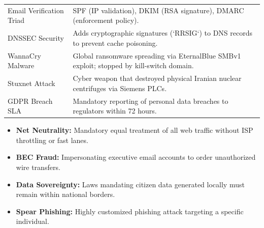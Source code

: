 \documentclass[12pt,a4paper]{article}
\renewcommand{\arraystretch}{1.45}
\begin{document}
\begin{tcolorbox}[formulabox, title={\textbf{Key Concepts and Metrics at a Glance}}]
\renewcommand{\arraystretch}{1.35}
\begin{tabularx}{\linewidth}{B{4.8cm} X}
Email Verification Triad & SPF (IP validation), DKIM (RSA signature), DMARC (enforcement policy). \\[3pt]
DNSSEC Security & Adds cryptographic signatures (`RRSIG`) to DNS records to prevent cache poisoning. \\[3pt]
WannaCry Malware & Global ransomware spreading via EternalBlue SMBv1 exploit; stopped by kill-switch domain. \\[3pt]
Stuxnet Attack & Cyber weapon that destroyed physical Iranian nuclear centrifuges via Siemens PLCs. \\[3pt]
GDPR Breach SLA & Mandatory reporting of personal data breaches to regulators within 72 hours.
\end{tabularx}
\end{tcolorbox}

\begin{tcolorbox}[defbox, title={\textbf{One-Line Definitions}}]
\begin{itemize}[leftmargin=*, itemsep=2pt, topsep=0pt]
  \item \textbf{Net Neutrality:} Mandatory equal treatment of all web traffic without ISP throttling or fast lanes.
  \item \textbf{BEC Fraud:} Impersonating executive email accounts to order unauthorized wire transfers.
  \item \textbf{Data Sovereignty:} Laws mandating citizen data generated locally must remain within national borders.
  \item \textbf{Spear Phishing:} Highly customized phishing attack targeting a specific individual.
\end{itemize}
\end{tcolorbox}
\end{document}
